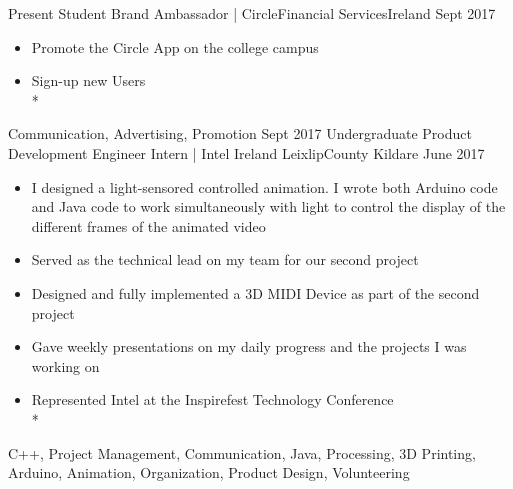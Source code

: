 
\begin{experiences}
  \experience
    {Present}   {Student Brand Ambassador | Circle}{Financial Services}{Ireland}
    {Sept 2017} {
                      \begin{itemize}
                        \item Promote the Circle App on the college campus    
                          \item Sign-up new Users  \\*                                                                            

                      \end{itemize}
                    }
                    {Communication, Advertising, Promotion}
  \emptySeparator
  \experience
    {Sept 2017} {Undergraduate Product Development Engineer Intern | Intel Ireland }{Leixlip}{County Kildare}
    {June 2017}    {
                      \begin{itemize}
                        \item I designed a light-sensored controlled animation. I wrote both Arduino code and Java code to work simultaneously with light to control the display of the different frames of the animated video                           
                        \item Served as the technical lead on my team for our second project            
                        \item Designed and fully implemented a 3D MIDI Device as part of the second project 
                        \item Gave weekly presentations on my daily progress and the projects I was working on
                        \item Represented Intel at the Inspirefest Technology Conference   \\*                                       
                      \end{itemize}
                    }
                    {C++, Project Management, Communication, Java, Processing, 3D Printing, Arduino, Animation, Organization, Product Design, Volunteering }
  \emptySeparator 
\end{experiences}
